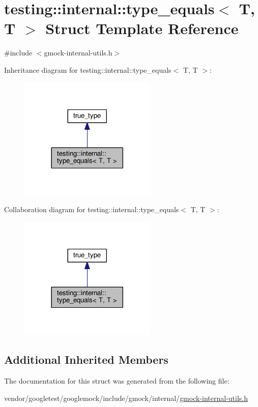 \hypertarget{structtesting_1_1internal_1_1type__equals_3_01T_00_01T_01_4}{}\section{testing\+:\+:internal\+:\+:type\+\_\+equals$<$ T, T $>$ Struct Template Reference}
\label{structtesting_1_1internal_1_1type__equals_3_01T_00_01T_01_4}


{\ttfamily \#include $<$gmock-\/internal-\/utils.\+h$>$}



Inheritance diagram for testing\+:\+:internal\+:\+:type\+\_\+equals$<$ T, T $>$\+:\nopagebreak
\begin{figure}[H]
\begin{center}
\leavevmode
\includegraphics[width=185pt]{structtesting_1_1internal_1_1type__equals_3_01T_00_01T_01_4__inherit__graph}
\end{center}
\end{figure}


Collaboration diagram for testing\+:\+:internal\+:\+:type\+\_\+equals$<$ T, T $>$\+:\nopagebreak
\begin{figure}[H]
\begin{center}
\leavevmode
\includegraphics[width=185pt]{structtesting_1_1internal_1_1type__equals_3_01T_00_01T_01_4__coll__graph}
\end{center}
\end{figure}
\subsection*{Additional Inherited Members}


The documentation for this struct was generated from the following file\+:\begin{DoxyCompactItemize}
\item 
vendor/googletest/googlemock/include/gmock/internal/\hyperlink{gmock-internal-utils_8h}{gmock-\/internal-\/utils.\+h}\end{DoxyCompactItemize}
